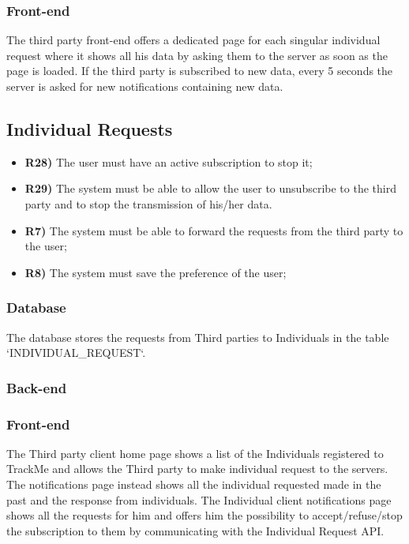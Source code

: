 \subsubsection*{Front-end}
The third party front-end offers a dedicated page for each singular individual request where it shows all his data by asking them to the server as soon as the page is loaded. If the third party is subscribed to new data, every 5 seconds the server is asked for new notifications containing new data.

\subsection{Individual Requests}
\begin{itemize}	
	\item {\color{Green}\textbf{R28)}} The user must have an active subscription to stop it;
	\item {\color{Green}\textbf{R29)}} The system must be able to allow the user to unsubscribe to the third party and to stop the transmission of his/her data.
	\item {\color{Green}\textbf{R7)}} The system must be able to forward the requests from the third party to the user;
	\item {\color{Green}\textbf{R8)}} The system must save the preference of the user;	
\end{itemize}

\subsubsection*{Database}
The database stores the requests from Third parties to Individuals in the table `INDIVIDUAL\_REQUEST`.

\subsubsection*{Back-end}



\subsubsection*{Front-end}
The Third party client home page shows a list of the Individuals registered to TrackMe and allows the Third party to make individual request to the servers. The notifications page instead shows all the individual requested made in the past and the response from individuals.
The Individual client notifications page shows all the requests for him and offers him the possibility to accept/refuse/stop the subscription to them by communicating with the Individual Request API.


